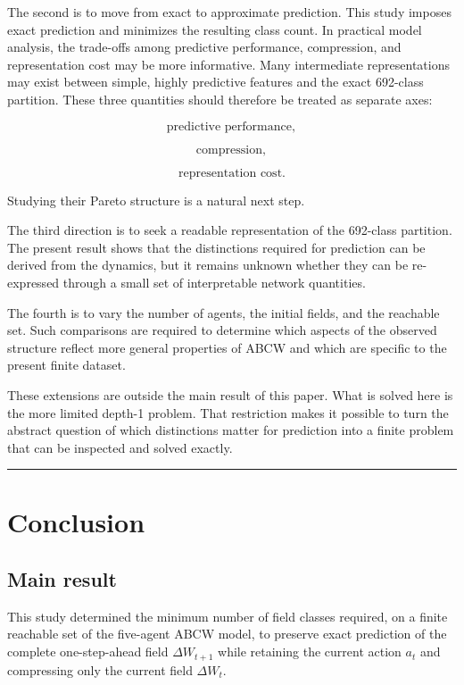 \documentclass[
  11pt,
]{article}
\begin{document}
The second is to move from exact to approximate prediction. This study
imposes exact prediction and minimizes the resulting class count. In
practical model analysis, the trade-offs among predictive performance,
compression, and representation cost may be more informative. Many
intermediate representations may exist between simple, highly predictive
features and the exact 692-class partition. These three quantities
should therefore be treated as separate axes:

\[{\text{predictive performance},}\]

\[{\text{compression},}\]

\[{\text{representation cost}.}\]

Studying their Pareto structure is a natural next step.

The third direction is to seek a readable representation of the
692-class partition. The present result shows that the distinctions
required for prediction can be derived from the dynamics, but it remains
unknown whether they can be re-expressed through a small set of
interpretable network quantities.

The fourth is to vary the number of agents, the initial fields, and the
reachable set. Such comparisons are required to determine which aspects
of the observed structure reflect more general properties of ABCW and
which are specific to the present finite dataset.

These extensions are outside the main result of this paper. What is
solved here is the more limited depth-1 problem. That restriction makes
it possible to turn the abstract question of which distinctions matter
for prediction into a finite problem that can be inspected and solved
exactly.

\begin{center}\rule{0.5\linewidth}{0.5pt}\end{center}

\hypertarget{conclusion}{%
\section{Conclusion}\label{conclusion}}

\hypertarget{main-result-1}{%
\subsection{Main result}\label{main-result-1}}

This study determined the minimum number of field classes required, on a
finite reachable set of the five-agent ABCW model, to preserve exact
prediction of the complete one-step-ahead field \({\Delta W_{t+1}}\)
while retaining the current action \({a_t}\) and compressing only the
current field \({\Delta W_t}\).
\end{document}

